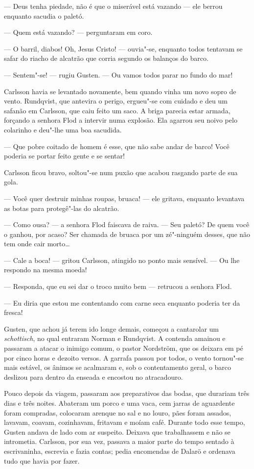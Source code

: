--- Deus tenha piedade, não é que o miserável está vazando --- ele berrou enquanto
sacudia o paletó.

--- Quem está vazando? --- perguntaram em coro.

--- O barril, diabos! Oh, Jesus Cristo! --- ouvia"-se, enquanto todos tentavam
se safar do riacho de alcatrão que corria segundo os balanços do barco.

--- Sentem"-se! --- rugiu Gusten. --- Ou vamos todos parar no fundo do mar!

 Carlsson havia se levantado novamente, bem quando vinha um novo sopro de vento.
 Rundqvist, que antevira o perigo, ergueu"-se com cuidado e deu um safanão em
 Carlsson, que caiu feito um saco. A briga parecia estar armada, forçando a senhora
 Flod a intervir numa explosão. Ela agarrou seu noivo pelo colarinho e deu"-lhe uma
 boa sacudida.

--- Que pobre coitado de homem é esse, que não sabe andar de barco! Você poderia se
portar feito gente e se sentar!

Carlsson ficou bravo, soltou"-se num puxão que acabou rasgando parte de sua gola.

--- Você quer destruir minhas roupas, bruaca! --- ele gritava, enquanto levantava
as botas para protegê"-las do alcatrão.

--- Como ousa? --- a senhora Flod faiscava de raiva. --- Seu paletó? De
quem você o ganhou, por acaso? Ser chamada de bruaca por um zé"-ninguém desses,
que não tem onde cair morto\ldots{}

--- Cale a boca! --- gritou Carlsson, atingido no ponto mais sensível. --- Ou lhe
respondo na mesma moeda!

--- Responda, que eu sei dar o troco muito bem --- retrucou a senhora Flod.

--- Eu diria que estou me contentando com carne seca enquanto poderia ter da fresca!

 Gusten, que achou já terem ido longe demais, começou a cantarolar um \textit{schottisch}, no
 qual entraram Norman e Rundqvist. A contenda amainou e passaram a atacar o
 inimigo comum, o pastor Nordström, que os deixara em pé por cinco horas e
 dezoito versos. A garrafa passou por todos, o vento tornou"-se mais estável, os
 ânimos se acalmaram e, sob o contentamento geral, o barco deslizou para dentro
 da enseada e encostou no atracadouro. 
 
 Pouco depois da viagem, passaram aos 
 preparativos das bodas, que durariam três dias e três noites. Abateram um porco
 e uma vaca, cem jarras de aguardente foram compradas, colocaram arenque no sal
 e no louro, pães foram assados, lavavam, coavam, cozinhavam, fritavam e moíam
 café. Durante todo esse tempo, Gusten andava de lado com ar suspeito. Deixava
 que trabalhassem e não se intrometia. Carlsson, por sua vez, passava a maior
 parte do tempo sentado à escrivaninha, escrevia e fazia contas; pedia
 encomendas de Dalarö e ordenava tudo que havia por fazer. 
 
